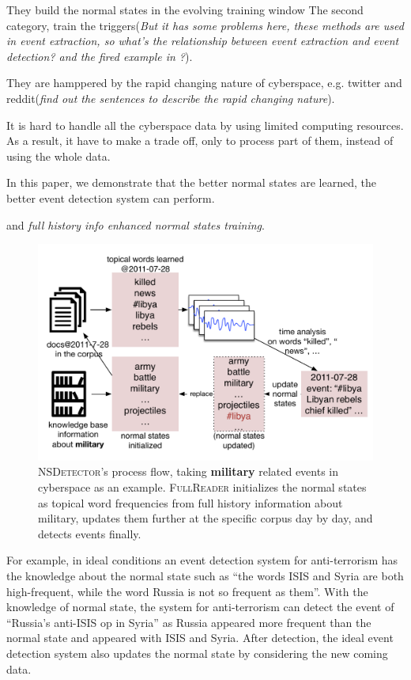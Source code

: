 \documentclass[conference,compsoc]{IEEEtran}
\begin{document}
They build the normal states in the evolving training window
The second category, train the triggers\cite{Li2013JointEE}\cite{Nguyen2015EventDA}(\textit{But it has some problems here, these methods are used in event extraction, so what's the relationship between event extraction and event detection? and the fired example in \cite{Li2013JointEE}?}). 

They are hamppered by the rapid changing nature of cyberspace, e.g. twitter and reddit(\textit{find out the sentences to describe the rapid changing nature}). 

It is hard to handle all the cyberspace data by using limited computing resources. As a result, it have to make a trade off, only to process part of them, instead of using the whole data. 



In this paper, we demonstrate that the better normal states  are learned, the better event detection system can perform.

 and \textit{full history info enhanced normal states training}. 

\begin{figure}
    \label{fig:modelDesc}
    \includegraphics[width=1.0\columnwidth]{img/NSDetectorExample.pdf}
    \caption{\textsc{NSDetector}'s process flow, taking \textbf{military} related events in cyberspace as an example. \textsc{FullReader} initializes the normal states as topical word frequencies from full history information about military, updates them further at the specific corpus day by day, and detects events finally.}
\end{figure}

For example, in ideal conditions an event detection system for anti-terrorism has the knowledge about the normal state such as “the words ISIS and Syria are both high-frequent, while the word Russia is not so frequent as them”. 
With the knowledge of normal state, the system for anti-terrorism can detect the event of “Russia's anti-ISIS op in Syria” as Russia appeared more frequent than the normal state and appeared with ISIS and Syria. 
After detection, the ideal event detection system also updates the normal state by considering the new coming data.
\end{document}
